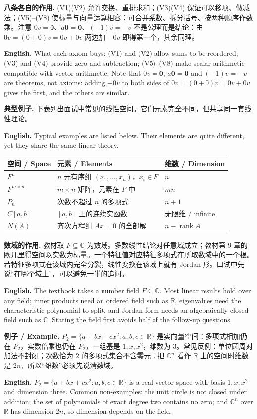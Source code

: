 \documentclass[UTF8,11pt,a4paper]{ctexart}
\newcommand{\EN}[1]{\par\noindent\textbf{English.} #1\par}
\newcommand{\EX}[2]{\par\noindent\textbf{例子 / Example.} #1\par\EN{#2}}
\begin{document}
\noindent\textbf{八条各自的作用.} (V1)(V2) 允许交换、重排求和；(V3)(V4) 保证可以移项、做减法；(V5)--(V8) 使标量与向量运算相容：可合并系数、拆分括号、按两种顺序作数乘。注意 $0v=\mathbf 0$、$a\mathbf 0=\mathbf 0$、$(-1)v=-v$ 不是公理而是结论：由 $0v=(0+0)v=0v+0v$ 两边加 $-0v$ 即得第一个，其余同理。
\EN{What each axiom buys: (V1) and (V2) allow sums to be reordered; (V3) and (V4) provide zero and subtraction; (V5)--(V8) make scalar arithmetic compatible with vector arithmetic. Note that $0v=\mathbf 0$, $a\mathbf 0=\mathbf 0$ and $(-1)v=-v$ are theorems, not axioms: adding $-0v$ to both sides of $0v=(0+0)v=0v+0v$ gives the first, and the others are similar.}
\noindent\textbf{典型例子.} 下表列出面试中常见的线性空间。它们元素完全不同，但共享同一套线性理论。
\EN{Typical examples are listed below. Their elements are quite different, yet they share the same linear theory.}
\begin{center}\small
\begin{tabular}{p{2.6cm}p{7.6cm}p{4.2cm}}
\toprule
空间 / Space & 元素 / Elements & 维数 / Dimension\\
\midrule
$F^n$ & $n$ 元有序组 $(x_1,\dots,x_n)$，$x_i\in F$ & $n$\\
$F^{m\times n}$ & $m\times n$ 矩阵，元素在 $F$ 中 & $mn$\\
$P_n$ & 次数不超过 $n$ 的多项式 & $n+1$\\
$C[a,b]$ & $[a,b]$ 上的连续实函数 & 无限维 / infinite\\
$N(A)$ & 齐次方程组 $Ax=0$ 的全部解 & $n-\operatorname{rank}A$\\
\bottomrule
\end{tabular}
\end{center}
\noindent\textbf{数域的作用.} 教材取 $F\subseteq\mathbb C$ 为数域。多数线性结论对任意域成立；教材第 9 章的欧几里得空间以实数为标量。一个特征值对应特征多项式在所取数域中的一个根。若特征多项式在该域内完全分裂，线性变换在该域上就有 Jordan 形。口试中先说“在哪个域上”，可以避免一半的追问。
\EN{The textbook takes a number field $F\subseteq\mathbb C$. Most linear results hold over any field; inner products need an ordered field such as $\mathbb R$, eigenvalues need the characteristic polynomial to split, and Jordan form needs an algebraically closed field such as $\mathbb C$. Stating the field first avoids half of the follow-up questions.}
\EX{$P_2=\{a+bx+cx^2:a,b,c\in\mathbb R\}$ 是实向量空间：多项式相加仍在 $P_2$，实数倍乘也仍在 $P_2$，一组基是 $1,x,x^2$，维数为 $3$。常见反例：单位圆周对加法不封闭；次数恰为 $2$ 的多项式集合不含零元；把 $\mathbb C^n$ 看作 $\mathbb R$ 上的空间时维数是 $2n$，所以“维数”必须先说清数域。}{$P_2=\{a+bx+cx^2:a,b,c\in\mathbb R\}$ is a real vector space with basis $1,x,x^2$ and dimension three. Common non-examples: the unit circle is not closed under addition; the set of polynomials of exact degree two contains no zero; and $\mathbb C^n$ over $\mathbb R$ has dimension $2n$, so dimension depends on the field.}
\end{document}
